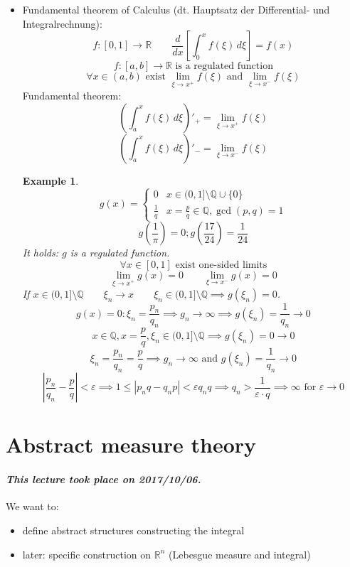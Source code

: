 \documentclass{article}
\newtheorem{example}{Example}  \numberwithin{example}{section}
\newcommand{\dateref}[1]{\paragraph{\textit{This lecture took place on #1.}}}
\begin{document}
\begin{itemize}
  \item Fundamental theorem of Calculus (dt. Hauptsatz der Differential- und Integralrechnung):
    \[ f: [0,1] \to \mathbb R \qquad \frac{d}{dx} \left[ \int_0^x f(\xi) \, d\xi \right] = f(x) \]
    \[ f: [a,b] \to \mathbb R \text{ is a regulated function} \]
    \[ \forall x \in (a,b) \text{ exist } \lim_{\xi\to x^+} f(\xi) \text{ and } \lim_{\xi \to x^-} f(\xi) \]
    Fundamental theorem:
    \[ \left(\int_a^x f(\xi) \, d\xi\right)'_+ = \lim_{\xi \to x^+} f(\xi) \]
    \[ \left(\int_a^x f(\xi) \, d\xi\right)'_- = \lim_{\xi \to x^-} f(\xi) \]
    \begin{example}
      \[
        g(x) = \begin{cases}
          0 & x \in (0,1] \setminus \mathbb Q \cup \{0\} \\
          \frac1q & x = \frac{p}{q} \in \mathbb Q, \operatorname{gcd}(p,q) = 1
        \end{cases}
      \]
      \[ g(\frac1\pi) = 0; g\left(\frac{17}{24}\right) = \frac1{24} \]
      It holds: $g$ is a regulated function.
      \[ \forall x \in [0,1] \text{ exist one-sided limits} \]
      \[ \lim_{\xi \to x^+} g(x) = 0 \qquad \lim_{\xi \to x^-} g(x) = 0 \]
      If $x \in (0,1] \setminus \mathbb Q \qquad \xi_n \to x \qquad \xi_n \in (0,1] \setminus \mathbb Q \implies g(\xi_n) = 0$.
      \[ g(x) = 0: \xi_n = \frac{p_n}{q_n} \implies g_n \to \infty \implies g(\xi_n) = \frac{1}{q_n} \to 0 \]
      \[ x \in \mathbb Q, x = \frac{p}{q}, \xi_n \in (0,1] \setminus \mathbb Q \implies g(\xi_n) = 0 \to 0 \]
      \[ \xi_n = \frac{p_n}{q_n} = \frac{p}{q} \implies g_n \to \infty \text{ and } g(\xi_n) = \frac{1}{q_n} \to 0 \]
      \[ \left|\frac{p_n}{q_n} - \frac{p}{q}\right| < \varepsilon \implies 1 \leq \left| p_nq - q_n p\right| < \varepsilon q_n q \implies q_n > \frac{1}{\varepsilon \cdot q} \implies \infty \text{ for } \varepsilon \to 0 \]
    \end{example}
\end{itemize}

\section{Abstract measure theory}

\dateref{2017/10/06}

We want to:
\begin{itemize}
  \item define abstract structures constructing the integral
  \item later: specific construction on $\mathbb R^n$ (Lebesgue measure and integral)
\end{itemize}
\end{document}
